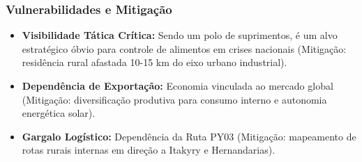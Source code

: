 \subsubsection{Vulnerabilidades e
Mitigação}

\begin{itemize}
\tightlist
\item
  \textbf{Visibilidade Tática Crítica:} Sendo um polo de suprimentos, é
  um alvo estratégico óbvio para controle de alimentos em crises
  nacionais (Mitigação: residência rural afastada 10-15 km do eixo
  urbano industrial).
\item
  \textbf{Dependência de Exportação:} Economia vinculada ao mercado
  global (Mitigação: diversificação produtiva para consumo interno e
  autonomia energética solar).
\item
  \textbf{Gargalo Logístico:} Dependência da Ruta PY03 (Mitigação:
  mapeamento de rotas rurais internas em direção a Itakyry e
  Hernandarias).
\end{itemize}

